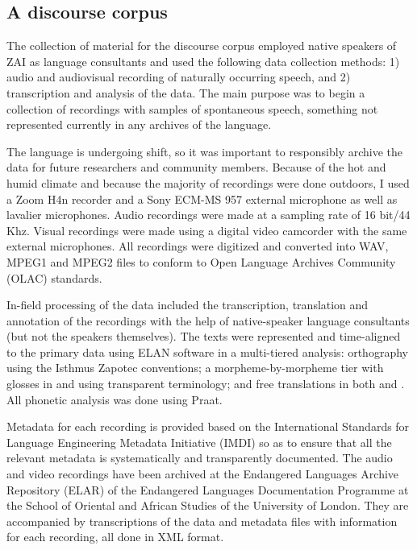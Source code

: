 

\subsection{A discourse corpus}

The collection of material for the discourse corpus employed native speakers of ZAI as language consultants and used the following data collection methods: 1) audio and audiovisual recording of naturally occurring speech, and 2) transcription and analysis of the data. The main purpose was to begin a collection of recordings with samples of spontaneous speech, something not represented currently in any archives of the language. 

The language is undergoing shift, so it was important to responsibly archive the data for future researchers and community members. Because of the hot and humid climate and because the majority of recordings were done outdoors, I used a Zoom H4n recorder and a Sony ECM-MS 957 external microphone as well as lavalier microphones. Audio recordings were made at a sampling rate of 16 bit/44 Khz. Visual recordings were made using a digital video camcorder with the same external microphones. All recordings were digitized and converted into WAV, MPEG1 and MPEG2 files to conform to Open Language Archives Community (OLAC) standards. 

In-field processing of the data included the transcription, translation and annotation of the recordings with the help of native-speaker language consultants (but not the speakers themselves). The texts were represented and time-aligned to the primary data using ELAN software in a multi-tiered analysis: orthography using the Isthmus Zapotec conventions; a morpheme-by-morpheme tier with glosses in  and  using transparent terminology; and free translations in both  and . All phonetic analysis was done using Praat. 

\largerpage
Metadata for each recording is provided based on the International Standards for Language Engineering Metadata Initiative (IMDI) so as to ensure that all the relevant metadata is systematically and transparently documented. The audio and video recordings have been archived at the Endangered Languages Archive Repository (ELAR) of the Endangered Languages Documentation Programme at the School of Oriental and African Studies of the University of London. They are accompanied by transcriptions of the data and metadata files with information for each recording, all done in XML format. 	

